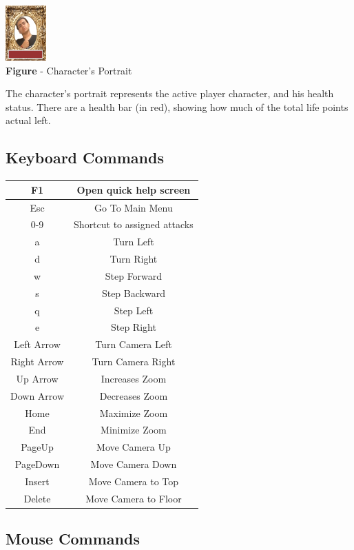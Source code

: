 \documentclass[ letterpaper,12pt]{article}
\begin{document}
\begin{center}
  \includegraphics{portrait.png}
\\{\bf Figure} - Character's Portrait
\end{center}

The character's portrait represents the active player character, and his health status. There are a health bar (in red), showing how much of the total life points actual left.

\subsection{Keyboard Commands}

\begin{tabular}{|c|c|}
\hline
F1 & Open quick help screen\\
\hline
Esc & Go To Main Menu\\
\hline
0-9 & Shortcut to assigned attacks\\
\hline
a & Turn Left\\
d & Turn Right\\
w & Step Forward\\
s & Step Backward\\
q & Step Left\\
e & Step Right\\
\hline
Left Arrow & Turn Camera Left\\
Right Arrow & Turn Camera Right\\
Up Arrow & Increases Zoom\\
Down Arrow & Decreases Zoom\\
Home & Maximize Zoom\\
End & Minimize Zoom\\
PageUp & Move Camera Up\\
PageDown & Move Camera Down\\
Insert & Move Camera to Top\\
Delete & Move Camera to Floor\\
\hline
\end{tabular}

\subsection{Mouse Commands}
\end{document}
